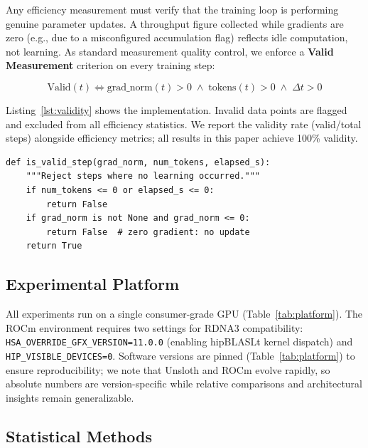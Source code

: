 Any efficiency measurement must verify that the training loop is performing genuine parameter updates. A throughput figure collected while gradients are zero (e.g., due to a misconfigured accumulation flag) reflects idle computation, not learning. As standard measurement quality control, we enforce a \textbf{Valid Measurement} criterion on every training step:

\begin{equation}
\text{Valid}(t) \iff \text{grad\_norm}(t) > 0 \;\wedge\; \text{tokens}(t) > 0 \;\wedge\; \Delta t > 0
\end{equation}

\noindent Listing~\ref{lst:validity} shows the implementation. Invalid data points are flagged and excluded from all efficiency statistics. We report the validity rate (valid/total steps) alongside efficiency metrics; all results in this paper achieve 100\% validity.

\begin{lstlisting}[caption={Per-step measurement validity check.},label={lst:validity}]
def is_valid_step(grad_norm, num_tokens, elapsed_s):
    """Reject steps where no learning occurred."""
    if num_tokens <= 0 or elapsed_s <= 0:
        return False
    if grad_norm is not None and grad_norm <= 0:
        return False  # zero gradient: no update
    return True
\end{lstlisting}

\subsection{Experimental Platform}
\label{sec:platform}

All experiments run on a single consumer-grade GPU (Table~\ref{tab:platform}). The ROCm environment requires two settings for RDNA3 compatibility: \texttt{HSA\_OVERRIDE\_GFX\_VERSION=11.0.0} (enabling hipBLASLt kernel dispatch) and \texttt{HIP\_VISIBLE\_DEVICES=0}. Software versions are pinned (Table~\ref{tab:platform}) to ensure reproducibility; we note that Unsloth and ROCm evolve rapidly, so absolute numbers are version-specific while relative comparisons and architectural insights remain generalizable.



\subsection{Statistical Methods}
\label{sec:statistics}

